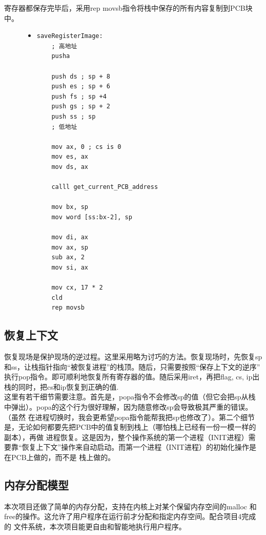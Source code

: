 \documentclass[a4paper]{article}
\begin{document}
    寄存器都保存完毕后，采用rep movsb指令将栈中保存的所有内容复制到PCB块中。
\begin{figure}
\begin{itemize}
\item[] \begin{lstlisting}[language={[x86masm]Assembler}, label=lst:save, caption=保存上下文的实现]
saveRegisterImage:
    ; 高地址
    pusha

    push ds ; sp + 8
    push es ; sp + 6
    push fs ; sp +4
    push gs ; sp + 2
    push ss ; sp 
    ; 低地址
    
    mov ax, 0 ; cs is 0
    mov es, ax
    mov ds, ax

    calll get_current_PCB_address

    mov bx, sp 
    mov word [ss:bx-2], sp 

    mov di, ax
    mov ax, sp
    sub ax, 2
    mov si, ax

    mov cx, 17 * 2
    cld
    rep movsb
\end{lstlisting}
\end{itemize}
\end{figure}
    \subsection{恢复上下文}\label{sec:load}
    恢复现场是保护现场的逆过程。这里采用略为讨巧的方法。恢复现场时，先恢复sp和ss，让栈指针指向``被恢复进程''的栈顶。随后，只需要按照``保存上下文的逆序''
    执行pop指令。即可顺利地恢复所有寄存器的值。随后采用iret，再把flag, cs, ip出栈的同时，把cs和ip恢复到正确的值.\\ 

    这里有若干细节需要注意。首先是，popa指令不会修改sp的值（但它会把sp从栈中弹出）。popa的这个行为很好理解，因为随意修改sp会导致极其严重的错误。（虽然
    在进程切换时，我会更希望popa指令能帮我把sp也修改了）。第二个细节是，无论如何都要先把PCB中的值复制到栈上（哪怕栈上已经有一份一模一样的副本），再做
    进程恢复。这是因为，整个操作系统的第一个进程（INIT进程）需要靠``恢复上下文''操作来自动启动。而第一个进程（INIT进程）的初始化操作是在PCB上做的，而不是
    栈上做的。
    \subsection{内存分配模型}
    本次项目还做了简单的内存分配，支持在内核上对某个保留内存空间的malloc 和free的操作。这允许了用户程序在运行前才分配和指定内存空间。配合项目4完成的
    文件系统，本次项目能更自由和智能地执行用户程序。\\ 
\end{document}
